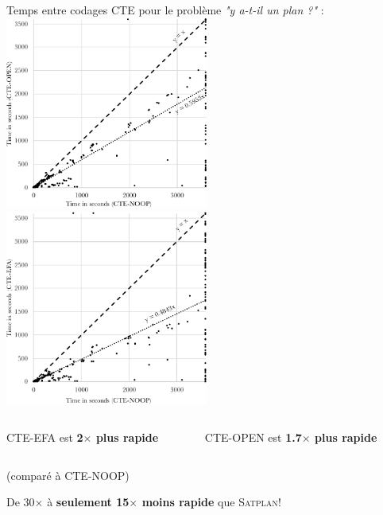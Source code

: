 \documentclass[english,french,usenames,dvipsnames]{beamer}
\begin{document}
\begin{frame}{\subsecname}
Temps entre codages CTE pour le problème \textit{"y a-t-il un plan ?"} :\\
\includegraphics[width=0.5\textwidth]{figures/coplas2018/time-plansat-open-noop3.pdf}
\includegraphics[width=0.5\textwidth]{figures/coplas2018/time-plansat-efa-noop3.pdf}
\vspace{-0.3cm}
\begin{columns}
\begin{column}{0.5\textwidth}\begin{center}
CTE-EFA est \textbf{2$\times$ plus rapide}
\end{center}\end{column}
\begin{column}{0.5\textwidth}\begin{center}
CTE-OPEN est \textbf{1.7$\times$ plus rapide}
\end{center}\end{column}
\end{columns}
\vspace{-0.2cm}
\begin{center}\small{}
(comparé à CTE-NOOP)
\end{center}
\begin{center}
De 30$\times$ à \textbf{seulement 15$\times$ moins rapide} que \textsc{Satplan}!
\end{center}
\end{frame}
\end{document}

